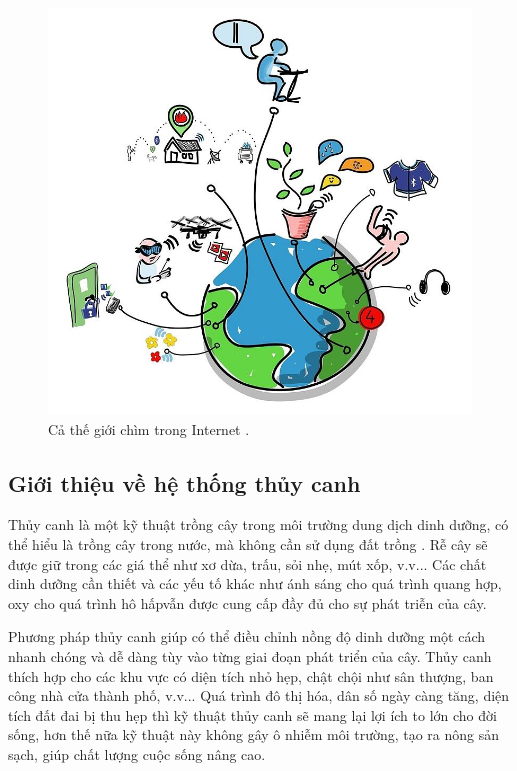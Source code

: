 \documentclass[a4paper,12pt,oneside]{article}
\begin{document}
\begin{figure}[H]
	\centering
	\includegraphics[scale=.4]{hinh/IoT_ungdung.jpg}
	\caption{Cả thế giới chìm trong Internet \cite{iot}.}
	\label{fig:IoT_ungdung}
\end{figure}

\subsection{Giới thiệu về hệ thống thủy canh}

\noindent Thủy canh là một kỹ thuật trồng cây trong môi trường dung dịch dinh dưỡng, có thể hiểu là trồng cây trong nước, mà không cần sử dụng đất trồng \cite{thuycanh}. Rễ cây sẽ được giữ trong các giá thể như xơ dừa, trấu, sỏi nhẹ, mút xốp, v.v... Các chất dinh dưỡng cần thiết và các yếu tố khác như ánh sáng cho quá trình quang hợp, oxy cho quá trình hô hấpvẫn được cung cấp đầy đủ cho sự phát triễn của cây. 

\noindent Phương pháp thủy canh giúp có thể điều chỉnh nồng độ dinh dưỡng một cách nhanh chóng và dễ dàng tùy vào từng giai đoạn phát triển của cây. Thủy canh thích hợp cho các khu vực có diện tích nhỏ hẹp, chật chội như sân thượng, ban công nhà cửa thành phố, v.v... Quá trình đô thị hóa, dân số ngày càng tăng, diện tích đất đai bị thu hẹp thì kỹ thuật thủy canh sẽ mang lại lợi ích to lớn cho đời sống, hơn thế nữa kỹ thuật này không gây ô nhiễm môi trường, tạo ra nông sản sạch, giúp chất lượng cuộc sống nâng cao.
\end{document}
